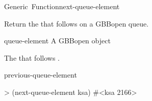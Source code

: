 \documentclass[10pt,twoside,english,pdftex]{article}
\begin{document}
\begin{functiondoc}{Generic~Function}{next-queue-element}{
   \returns{} }
%

\fnsyntax

\fnpurpose Return the  that follows 
on a GBBopen queue.

\fnmethods
{}%
  {\code{(} 
  \returns{} }

\fnpackage {}

\fnmodule {}

\fnargs
\begin{args}{queue-element}
 A GBBopen  object
\end{args}

\fnreturns The  that follows
. 
  
\begin{alsos}{previous-queue-element}
\end{alsos}

\fnexample
%
\W\supp
\begin{example}
> (next-queue-element ksa)
#<ksa 2166>
\end{example}

\end{functiondoc}

\end{document}
